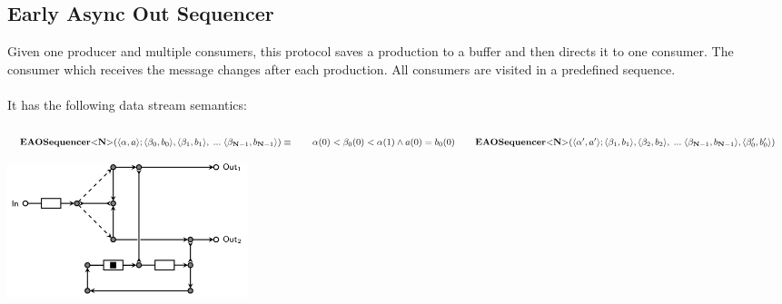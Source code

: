 \subsection{Early Async Out Sequencer}
\begin{minipage}{.65\textwidth}
  Given one producer and multiple consumers, this protocol saves a production to a buffer and then directs it to one consumer. The consumer which receives the message changes after each production. All consumers are visited in a predefined sequence.\\\\
  It has the following data stream semantics:\\\\
  $
  \vspace{0.2cm}\eaoseq (\langle \alpha, a \rangle;\langle \beta_0, b_0 \rangle, \langle \beta_1, b_1 \rangle,\;...\; \langle \beta_{\textbf{N}-1}, b_{\textbf{N}-1} \rangle) \equiv
  \vspace{0.2cm} \hphantom \qquad \alpha(0) < \beta_0(0) < \alpha(1) \land a(0) = b_0(0) \\
  \hphantom \qquad \eaoseq (\langle \alpha', a' \rangle; \langle \beta_1, b_1 \rangle,\langle \beta_2, b_2 \rangle,\;...\; \langle \beta_{\textbf{N}-1}, b_{\textbf{N}-1} \rangle, \langle \beta_0', b_0' \rangle)
  $
\end{minipage}\hspace{0.05cm}
\begin{minipage}{.25\textwidth}
  \includegraphics[width=7cm]{img/eaoseq.png}\\
\end{minipage}
